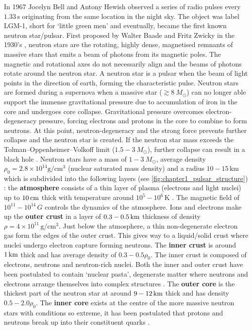 In 1967 Jocelyn Bell and Antony Hewish observed a series of radio pulses every $1.33\,\si{\second}$ originating from the same location in the night sky. The object was label LGM-1, short for `little green men' and eventually, became the first known neutron star/pulsar. First proposed by Walter Baade and Fritz Zwicky in the 1930's \citep{1934PhRv...46...76B}, neutron stars are the rotating, highly dense, magnetised remnants of massive stars that emits a beam of photons from its magnetic poles. The magnetic and rotational axes do not necessarily align and the beams of photons rotate around the neutron star. A neutron star is a pulsar when the beam of light points in the direction of earth, forming the characteristic pulse.
\newpar
Neutron stars are formed during a supernova when a massive star ($\gtrsim 8~M_\odot$) can no longer able support the immense gravitational pressure due to accumulation of iron in the core and undergoes core collapse. Gravitational pressure overcomes electron-degeneracy pressure, forcing electrons and protons in the core to combine to form neutrons. At this point, neutron-degeneracy and the strong force prevents further collapse and the neutron star is created. If the neutron star mass exceeds the Tolman–Oppenheimer–Volkoff limit ($1.5-3~M_\odot$), further collapse can result in a black hole \citep{1996A&A...305..871B, 2015SSRv..188..187S}.
\newpar
Neutron stars have a mass of $1-3~M_\odot$, average density $\rho_0=2.8\times 10^{14}\si{\gram\per\centi\meter\cubed}$ (nuclear saturated mass density) and a radius $10-15\,\si{\kilo\meter}$ which is subdivided into the following layers (see \autoref{fig:chapter1_pulsar_structure}) \citep{2007ASSL..326.....H}: the \textbf{atmosphere} consists of a thin layer of plasma (electrons and light nuclei) up to $10\,\si{\centi\meter}$ thick with temperature around $10^5-10^6\,\si{\kelvin}$ \citep{2002nsps.conf..263Z}. The magnetic field of $10^{11}-10^{14}\,\si{G}$ controls the dynamics of the atmosphere. Ions and electrons make up the \textbf{outer crust} in a layer of $0.3-0.5\,\si{\kilo\meter}$ thickness of density $\rho=4\times 10^{11}\,\si{\gram\per\centi\meter\cubed}$. Just below the atmosphere, a thin non-degenerate electron gas form the edges of the outer crust. This gives way to a liquid/solid crust where nuclei undergo electron capture forming neutrons. The \textbf{inner crust} is around $1\,\si{\kilo\meter}$ thick and has average density of $0.3-0.5\rho_0$. The inner crust is composed of electrons, neutrons and neutron-rich nuclei. Both the inner and outer crust have been postulated to contain `nuclear pasta', degenerate matter where neutrons and electrons arrange themselves into complex structures \citep{PhysRevC.88.065807}. The \textbf{outer core} is the thickest part of the neutron star at around $9-12\,\si{\kilo\meter}$ thick and has density $0.5-2.0\rho_0$. The \textbf{inner core} exists at the centre of the more massive neutron stars with conditions so extreme, it has been postulated that protons and neutrons break up into their constituent quarks \citep{2007ASSL..326.....H}.
